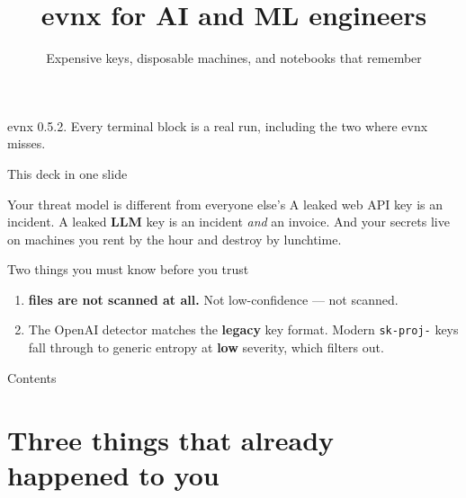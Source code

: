 \documentclass[aspectratio=169,10pt]{beamer}
\title{evnx for AI and ML engineers}
\subtitle{Expensive keys, disposable machines, and notebooks that remember}
\date{}
\begin{document}
\begin{frame}[plain]
  \titlepage
  \begin{center}\footnotesize
  \textcolor{evnxMuted}{evnx 0.5.2. Every terminal block is a real run,
  including the two where evnx misses.}
  \end{center}
\end{frame}

\begin{frame}{This deck in one slide}
  \begin{block}{Your threat model is different from everyone else's}
    A leaked web API key is an incident. A leaked \textbf{LLM} key is an
    incident \emph{and} an invoice. And your secrets live on machines you
    rent by the hour and destroy by lunchtime.
  \end{block}

  \vspace{0.6em}
  \begin{block}{Two things you must know before you trust }
    \begin{enumerate}
      \item \textbf{ files are not scanned at all.} Not
            low-confidence --- not scanned.
      \item The OpenAI detector matches the \textbf{legacy} key format.
            Modern \texttt{sk-proj-} keys fall through to generic entropy at
            \textbf{low} severity, which  filters out.
    \end{enumerate}
  \end{block}
\end{frame}

\begin{frame}{Contents}\tableofcontents[hideallsubsections]\end{frame}

\section{Three things that already happened to you}
\end{document}
